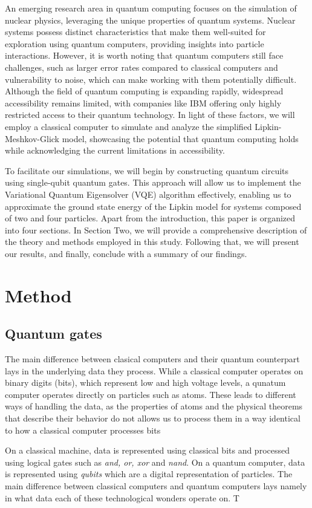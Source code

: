 \documentclass[onecolumn,10pt,cleanfoot]{asme2ej}
\begin{document}
An emerging research area in quantum computing focuses on the simulation of nuclear physics, leveraging the unique properties of quantum systems. Nuclear systems possess distinct characteristics that make them well-suited for exploration using quantum computers, providing insights into particle interactions. However, it is worth noting that quantum computers still face challenges, such as larger error rates compared to classical computers and vulnerability to noise, which can make working with them potentially difficult. Although the field of quantum computing is expanding rapidly, widespread accessibility remains limited, with companies like IBM offering only highly restricted access to their quantum technology. In light of these factors, we will employ a classical computer to simulate and analyze the simplified Lipkin-Meshkov-Glick model, showcasing the potential that quantum computing holds while acknowledging the current limitations in accessibility.

To facilitate our simulations, we will begin by constructing quantum circuits using single-qubit quantum gates. This approach will allow us to implement the Variational Quantum Eigensolver (VQE) algorithm effectively, enabling us to approximate the ground state energy of the Lipkin model for systems composed of two and four particles. Apart from the introduction, this paper is organized into four sections. In Section Two, we will provide a comprehensive description of the theory and methods employed in this study. Following that, we will present our results, and finally, conclude with a summary of our findings.
 
 \section{Method}

 \subsection{Quantum gates}
 The main difference between clasical computers and their quantum counterpart lays in the underlying data they process. While a classical computer operates on binary digits (bits), which represent low and high voltage levels, a qunatum computer operates directly on particles such as atoms. These leads to different ways of handling the data, as the properties of atoms and the physical theorems that describe their behavior do not allows us to process them in a way identical to how a classical computer processes bits

On a classical machine, data is represented using classical bits and processed using logical gates such as \emph{and, or, xor} and \emph{nand}. On a quantum computer, data is represented using \emph{qubits} which are a digital representation of particles. The main difference between classical computers and quantum computers lays namely in what data each of these technological wonders operate on. T 
\end{document}
